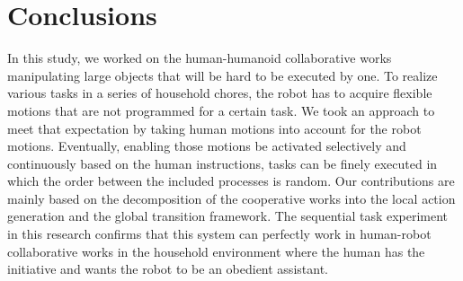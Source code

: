 \section{Conclusions}
In this study, we worked on the human-humanoid collaborative works manipulating large objects that will be hard to be executed by one. To realize various tasks in a series of household chores, the robot has to acquire flexible motions that are not programmed for a certain task. We took an approach to meet that expectation by taking human motions into account for the robot motions. Eventually, enabling those motions be activated selectively and continuously based on the human instructions, tasks can be finely executed in which the order between the included processes is random.
Our contributions are mainly based on the decomposition of the cooperative works into the local action generation and the global transition framework. The sequential task experiment in this research confirms that this system can perfectly work in human-robot collaborative works in the household environment where the human has the initiative and wants the robot to be an obedient assistant.
